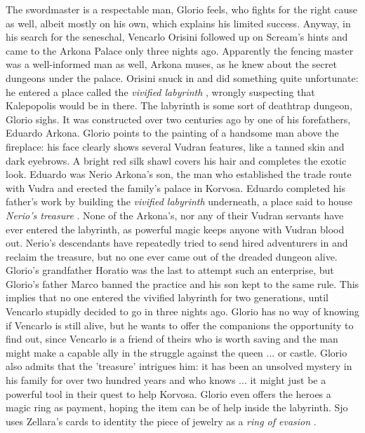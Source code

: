 The swordmaster is a respectable man, Glorio feels, who fights for the right cause as well, albeit mostly on his own, which explains his limited success. Anyway, in his search for the seneschal, Vencarlo Orisini followed up on Scream's hints and came to the Arkona Palace only three nights ago. Apparently the fencing master was a well-informed man as well, Arkona muses, as he knew about the secret dungeons under the palace. Orisini snuck in and did something quite unfortunate: he entered a place called the {\itshape vivified labyrinth} , wrongly suspecting that Kalepopolis would be in there. The labyrinth is some sort of deathtrap dungeon, Glorio sighs. It was constructed over two centuries ago by one of his forefathers, Eduardo Arkona. Glorio points to the painting of a handsome man above the fireplace: his face clearly shows several Vudran features, like a tanned skin and dark eyebrows. A bright red silk shawl covers his hair and completes the exotic look. Eduardo was Nerio Arkona's son, the man who established the trade route with Vudra and erected the family's palace in Korvosa. Eduardo completed his father's work by building the {\itshape vivified labyrinth} underneath, a place said to house  {\itshape Nerio's treasure} . None of the Arkona's, nor any of their Vudran servants have ever entered the labyrinth, as powerful magic keeps anyone with Vudran blood out. Nerio's descendants have repeatedly tried to send hired adventurers in and reclaim the treasure, but no one ever came out of the dreaded dungeon alive. Glorio's grandfather Horatio was the last to attempt such an enterprise, but Glorio's father Marco banned the practice and his son kept to the same rule. This implies that no one entered the vivified labyrinth for two generations, until Vencarlo stupidly decided to go in three nights ago. Glorio has no way of knowing if Vencarlo is still alive, but he wants to offer the companions the opportunity to find out, since Vencarlo is a friend of theirs who is worth saving and the man might make a capable ally in the struggle against the queen ... or castle. Glorio also admits that the 'treasure' intrigues him: it has been an unsolved mystery in his family for over two hundred years and who knows ... it might just be a powerful tool in their quest to help Korvosa. Glorio even offers the heroes a magic ring as payment, hoping the item can be of help inside the labyrinth. Sjo uses Zellara's cards to identity the piece of jewelry as a {\itshape ring of evasion} . 